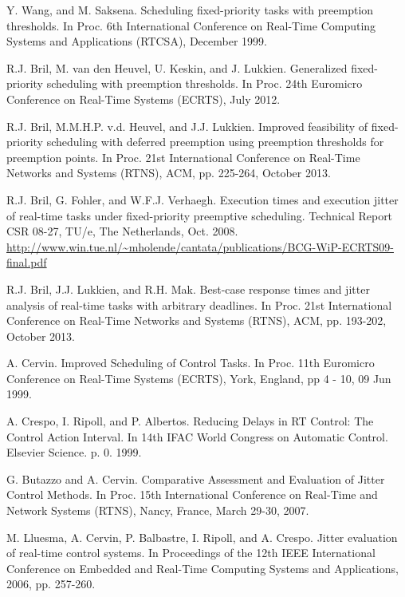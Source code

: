 \documentclass[fleqn]{article}
\begin{document}
\begin{thebibliography}{10}
	
	Y. Wang, and M. Saksena.
	Scheduling fixed-priority tasks with preemption thresholds.
	In Proc. 6th International Conference on Real-Time Computing Systems and Applications (RTCSA), December 1999.	
	
	R.J. Bril, M. van den Heuvel, U. Keskin, and J. Lukkien.
	Generalized fixed-priority scheduling with preemption thresholds.
	In Proc. 24th Euromicro Conference on Real-Time Systems (ECRTS), July 2012.
	
	R.J. Bril, M.M.H.P. v.d. Heuvel, and J.J. Lukkien.
	Improved feasibility of fixed-priority scheduling with deferred preemption using preemption thresholds for preemption points.
	In Proc. 21st International Conference on Real-Time Networks and Systems (RTNS), ACM, pp. 225-264, October 2013.
	
	R.J. Bril, G. Fohler, and W.F.J. Verhaegh. 
	Execution times and execution jitter of real-time tasks under fixed-priority preemptive scheduling. 
	Technical Report CSR 08-27, TU/e, The Netherlands, Oct. 2008. \url{http://www.win.tue.nl/~mholende/cantata/publications/BCG-WiP-ECRTS09-final.pdf}
	
	R.J. Bril, J.J. Lukkien, and R.H. Mak.
	Best-case response times and jitter analysis of real-time tasks with arbitrary deadlines.
	In Proc. 21st International Conference on Real-Time Networks and Systems (RTNS), ACM, pp. 193-202, October 2013.
	
	A. Cervin. 
	Improved Scheduling of Control Tasks.
	In Proc. 11th Euromicro Conference on Real-Time Systems (ECRTS), York, England, pp 4 - 10, 09 Jun 1999. 
	
	A. Crespo, I. Ripoll, and P. Albertos. 
	Reducing Delays in RT Control: The Control Action Interval. 
	In 14th IFAC World Congress on Automatic Control. Elsevier Science. p. 0. 1999.
	
	G. Butazzo and A. Cervin. 
	Comparative Assessment and Evaluation of Jitter Control Methods. 
	In Proc. 15th International Conference on Real-Time and Network Systems (RTNS), Nancy, France, March 29-30, 2007.
	
	M. Lluesma, A. Cervin, P. Balbastre, I. Ripoll, and A. Crespo.
	Jitter evaluation of real-time control systems.
	In Proceedings of the 12th IEEE International Conference on Embedded and Real-Time Computing Systems and Applications, 2006, pp. 257-260.
	

\end{thebibliography}
\end{document}
